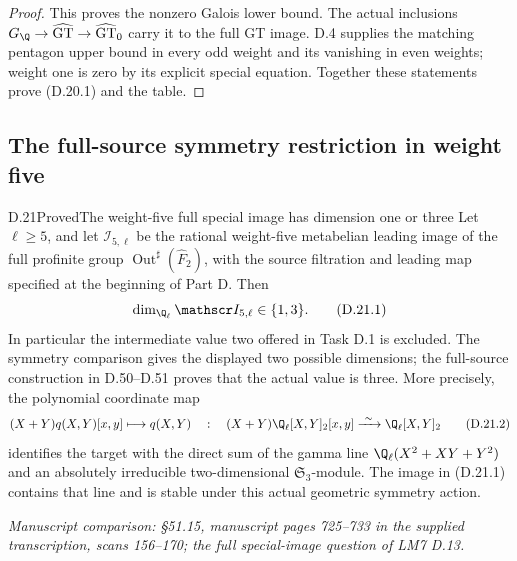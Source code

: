 \begin{proof}
This proves the nonzero Galois lower bound. The actual
inclusions $G_\Q\to\widehat{\rm GT}\to
\widehat{\rm GT}_0$ carry it to the full GT image.
D.4 supplies the matching pentagon upper bound in
every odd weight and its vanishing in even weights;
weight one is zero by its explicit special equation.
Together these statements prove (D.20.1) and the table.
\end{proof}
\subsection{The full-source symmetry restriction in weight five}

\begin{statement}{D.21}{Proved}{The weight-five full special image has dimension one or three}
Let $\ell\ge5$, and let $\mathscr I_{5,\ell}$ be the rational
weight-five metabelian leading image of the full profinite group
$\operatorname{Out}^{\sharp}(\widehat F_2)$, with the source
filtration and leading map specified at the beginning of Part D.
Then
\[
             \dim_{\Q_\ell}\mathscr I_{5,\ell}\in\{1,3\}.
             \tag{D.21.1}
\]
In particular the intermediate value two offered in Task D.1 is
excluded. The symmetry comparison gives the displayed two possible
dimensions; the full-source construction in D.50--D.51 proves
that the actual value is three.
More precisely, the polynomial coordinate map
\[
 (X+Y)q(X,Y)[x,y]\longmapsto q(X,Y)
 \quad:\quad
 (X+Y)\Q_\ell[X,Y]_2[x,y]\xrightarrow{\ \sim\ }
                    \Q_\ell[X,Y]_2
 \tag{D.21.2}
\]
identifies the target with the direct sum of the gamma line
$\Q_\ell(X^2+XY+Y^2)$ and an absolutely irreducible
two-dimensional $\mathfrak S_3$-module. The image in
(D.21.1) contains that line and is stable under this actual
geometric symmetry action.
\par\smallskip\noindent\emph{Manuscript comparison: \S51.15,
manuscript pages 725--733 in the supplied transcription,
scans 156--170; the full special-image question of LM7 D.13.}
\end{statement}
